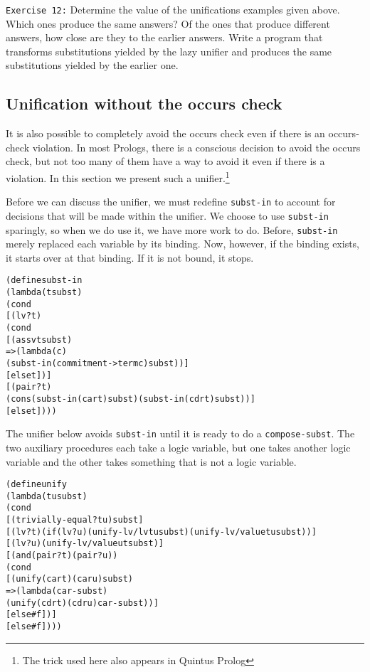 \texttt{Exercise 12:} Determine the value of the unifications examples
given above.  Which ones produce the same answers?  Of the ones that
produce different answers, how close are they to the earlier answers.
Write a program that transforms substitutions yielded by the lazy
unifier and produces the same substitutions yielded by the earlier
one.
\subsection{Unification without the occurs check}

It is also possible to completely avoid the occurs check even if
there is an occurs-check violation.  In most Prologs, there is a
conscious decision to avoid the occurs check, but not too many of
them have a way to avoid it even if there is a violation. In
this section we present such a unifier.\footnote{The trick used here
also appears in Quintus Prolog}

Before we can discuss the unifier, we must redefine \texttt{subst-in}
to account for decisions that will be made within the unifier.  We
choose to use \texttt{subst-in} sparingly, so when we do use it, we
have more work to do.  Before, \texttt{subst-in} merely replaced each
variable by its binding.  Now, however, if the binding exists,
it starts over at that binding.  If it is not bound, it stops.

\begin{alltt}
(define subst-in
  (lambda (t subst)
    (cond
      [(lv? t)
       (cond
         [(assv t subst)
          => (lambda (c)
               (subst-in (commitment->term c) subst))]
         [else t])]
      [(pair? t)
       (cons (subst-in (car t) subst) (subst-in (cdr t) subst))]
      [else t])))
\end{alltt}

The unifier below avoids \texttt{subst-in} until it is ready to do
a \texttt{compose-subst}.  The two auxiliary procedures each take
a logic variable, but one takes another logic variable and the other
takes something that is not a logic variable.  

\begin{alltt}
(define unify
  (lambda (t u subst)
    (cond
      [(trivially-equal? t u) subst]
      [(lv? t) (if (lv? u) (unify-lv/lv t u subst) (unify-lv/value t u subst))]
      [(lv? u) (unify-lv/value u t subst)]
      [(and (pair? t) (pair? u))
       (cond
         [(unify (car t) (car u) subst)
          => (lambda (car-subst)
               (unify (cdr t) (cdr u) car-subst))]
         [else #f])]
      [else #f])))
\end{alltt}

